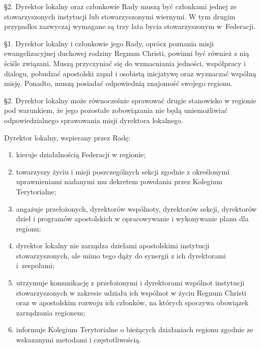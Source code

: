\S{}2. Dyrektor lokalny oraz członkowie Rady muszą być członkami jednej ze stowarzyszonych instytucji lub stowarzyszonymi wiernymi. W tym drugim przypadku zazwyczaj wymagane są trzy lata bycia stowarzyszonym \mbox{w Federacji}.


 \S{}1. Dyrektor lokalny i członkowie jego Rady, oprócz poznania misji ewangelizacyjnej duchowej rodziny Regnum Christi, powinni być również z nią ściśle związani. Muszą przyczyniać się do wzmacniania jedności, współpracy i dialogu, pobudzać apostolski zapał i osobistą inicjatywę oraz wyznaczać wspólną misję. Ponadto, muszą posiadać odpowiednią znajomość swojego regionu.

\S{}2. Dyrektor lokalny może równocześnie sprawować drugie stanowisko w regionie pod warunkiem, że jego pozostałe zobowiązania nie będą uniemożliwiać odpowiedzialnego sprawowania misji dyrektora lokalnego.

\filbreak{}

 Dyrektor lokalny, wspierany przez Radę:
\begin{enumerate}
	
	\item kieruje działalnością Federacji w regionie;
	
	\item towarzyszy życiu i misji poszczególnych sekcji zgodnie z określonymi uprawnieniami nadanymi mu dekretem powołania przez Kolegium Terytorialne;
	
	\item angażuje przełożonych, dyrektorów wspólnoty, dyrektorów sekcji, dyrektorów dzieł i programów apostolskich w opracowywanie i wykonywanie planu dla regionu;
	
	\item dyrektor lokalny nie zarządza dziełami apostolskimi instytucji stowarzyszonych, ale mimo tego dąży do synergii z ich dyrektorami \mbox{i zespołami};
	
	\item utrzymuje komunikację z przełożonymi i dyrektorami wspólnot instytucji stowarzyszonych w zakresie udziału ich wspólnot w życiu Regnum Christi oraz w apostolskim rozwoju ich członków, na których spoczywa obowiązek zarządzania regionem;
	
	\item informuje Kolegium Terytorialne o bieżących działaniach regionu zgodnie ze wskazanymi metodami i częstotliwością.
\end{enumerate}

